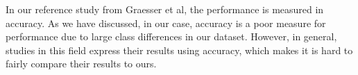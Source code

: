 In our reference study from Graesser et al, the performance is measured in accuracy. As we have discussed, in our case, accuracy is a poor measure for performance due to large class differences in our dataset. However, in general, studies in this field express their results using accuracy, which makes it is hard to fairly compare their results to ours.




























